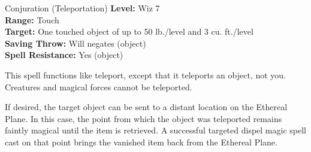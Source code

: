 {Conjuration (Teleportation)}
{
	\textbf{Level:}
	Wiz 7\\
	\textbf{Range:}
	Touch\\
	\textbf{Target:}
	One touched object of up to 50 lb./level and 3 cu. ft./level\\
	\textbf{Saving Throw:}
	Will negates (object)\\
	\textbf{Spell Resistance:}
	Yes (object)\\
}
{
	This spell functions like teleport, except that it teleports an object, not you. Creatures and magical forces cannot be teleported.

	If desired, the target object can be sent to a distant location on the Ethereal Plane. In this case, the point from which the object was teleported remains faintly magical until the item is retrieved. A successful targeted dispel magic spell cast on that point brings the vanished item back from the Ethereal Plane.

}

